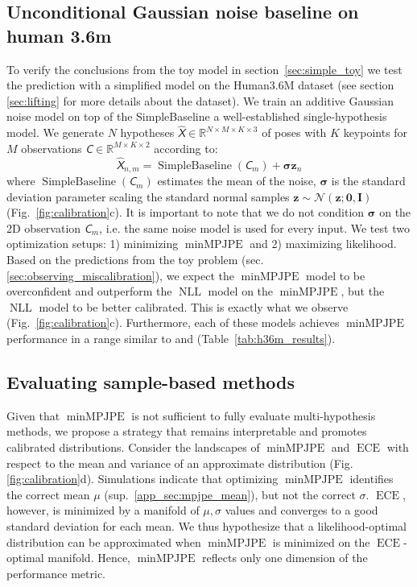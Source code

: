 \documentclass{article} \usepackage{iclr2023_conference,times}
\def\vsigma{{\bm{\sigma}}}
\def\vz{{\bm{z}}}
\def\mI{{\bm{I}}}
\newcommand{\tens}[1]{\bm{\mathsfit{#1}}}
\def\tC{{\tens{C}}}
\def\tX{{\tens{X}}}
\newcommand{\R}{\mathbb{R}}
\begin{document}
    \subsection{Unconditional Gaussian noise baseline on human 3.6m}
    To verify the conclusions from the toy model in section~\ref{sec:simple_toy} we test the prediction with a simplified model on the Human3.6M dataset  \citep{IonescuSminchisescu11, h36m_pami} (see section \ref{sec:lifting} for more details about the dataset).
    We train an additive Gaussian noise model on top of the SimpleBaseline \citep{martinez_2017_3dbaseline} a well-established single-hypothesis model.
    We generate $N$ hypotheses $\hat{\tX} \in \R^{N\times M \times K \times 3}$ of poses with $K$ keypoints for $M$ observations $\tC \in \R^{M \times K \times 2}$ according to:
    \begin{equation*}
        \hat{\tX}_{n, m} = \operatorname{SimpleBaseline}(\tC_m) + \vsigma \vz_n
    \end{equation*}
    where $\operatorname{SimpleBaseline}(\tC_m)$ estimates the mean of the noise, $\vsigma$ is the standard deviation parameter scaling the standard normal samples $\vz \sim \mathcal{N}(\vz; \mathbf{0}, \mI)$ (Fig.~\ref{fig:calibration}c).
    It is important to note that we do not condition $\vsigma$ on the 2D observation $\tC_m$, i.e. the same noise model is used for every input.
    We test two optimization setups: 1) minimizing $\operatorname{minMPJPE}$ and 2) maximizing likelihood.
    Based on the predictions from the toy problem (sec. \ref{sec:observing_miscalibration}), we expect the $\operatorname{minMPJPE}$ model to be overconfident and outperform the $\operatorname{NLL}$ model on the $\operatorname{minMPJPE}$, but the $\operatorname{NLL}$ model to be better calibrated. 
    This is exactly what we observe (Fig.~\ref{fig:calibration}c).
    Furthermore, each of these models achieves $\operatorname{minMPJPE}$ performance in a range similar to \citet{Sharma_Varigonda_Bindal_Sharma_Jain_2019} and \citet{Wehrbein_Rudolph_Rosenhahn_Wandt_2021} (Table~\ref{tab:h36m_results}).
    
    \subsection{Evaluating sample-based methods}
    Given that $\operatorname{minMPJPE}$ is not sufficient to fully evaluate multi-hypothesis methods, we propose a strategy that remains interpretable and promotes calibrated distributions.
    Consider the landscapes of $\operatorname{minMPJPE}$ and $\operatorname{ECE}$ with respect to the mean and variance of an approximate distribution (Fig. \ref{fig:calibration}d). Simulations indicate that optimizing $\operatorname{minMPJPE}$ identifies the correct mean $\mu$ (sup.~\ref{app_sec:mpjpe_mean}), but not  the correct $\sigma$. 
    $\operatorname{ECE}$, however, is minimized by a manifold of $\mu, \sigma$ values and converges to a good standard deviation for each mean.
    We thus hypothesize that a likelihood-optimal distribution can be approximated when $\operatorname{minMPJPE}$ is minimized on the $\operatorname{ECE}$-optimal manifold.
    Hence, $\operatorname{minMPJPE}$ reflects only one dimension of the performance metric.
\end{document}
